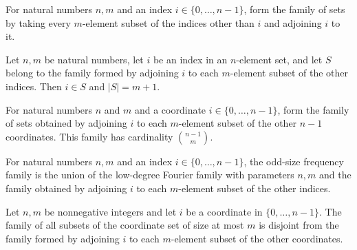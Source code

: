 \begin{definition}
\label{FABL.oddKWiseFrequencyExtension}
\leanok
For natural numbers $n,m$ and an index $i\in\{0,\ldots,n-1\}$, form the family of sets
by taking every $m$-element subset of the indices other than $i$ and adjoining $i$ to
it.
\end{definition}

\begin{theorem}
\label{FABL.mem_oddKWiseFrequencyExtension_card}
\leanok
{}
Let $n,m$ be natural numbers, let $i$ be an index in an $n$-element set, and let $S$
belong to the family formed by adjoining $i$ to each $m$-element subset of the other
indices. Then $i\in S$ and $|S|=m+1$.
\end{theorem}

\begin{theorem}
\label{FABL.card_oddKWiseFrequencyExtension}
\leanok
{}
For natural numbers $n$ and $m$ and a coordinate $i\in\{0,\ldots,n-1\}$, form the family
of sets obtained by adjoining $i$ to each $m$-element subset of the other $n-1$
coordinates. This family has cardinality $\binom{n-1}{m}$.
\end{theorem}

\begin{definition}
\label{FABL.oddKWiseFrequencyFamily}
\leanok
{}
For natural numbers $n,m$ and an index $i\in\{0,\ldots,n-1\}$, the odd-size frequency
family is the union of the low-degree Fourier family with parameters $n,m$ and the
family obtained by adjoining $i$ to each $m$-element subset of the other indices.
\end{definition}

\begin{theorem}
\label{FABL.disjoint_lowDegreeFourierFamily_oddKWiseFrequencyExtension}
\leanok
{}
Let $n,m$ be nonnegative integers and let $i$ be a coordinate in $\{0,\ldots,n-1\}$. The
family of all subsets of the coordinate set of size at most $m$ is disjoint from the
family formed by adjoining $i$ to each $m$-element subset of the other coordinates.
\end{theorem}

